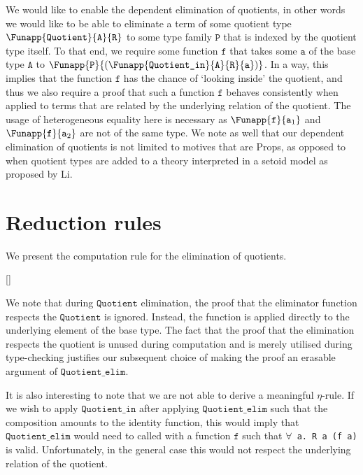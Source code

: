 \documentclass[12pt,twoside,maitrise]{dms}
\theoremstyle{definition}
\numberwithin{equation}{section}
\numberwithin{table}{chapter}
\numberwithin{figure}{chapter}
\newcommand\id[1] {\texttt{#1}}
\newcommand\fn[1] {\texttt{#1}}
\newcommand\type[1] {\textsf{#1}} %
\begin{document}
We would like to enable the dependent elimination of quotients, in other words
we would like to be able to eliminate a term of some quotient type
$\Funapp{\id{Quotient}}{\id{A}}{\id{R}}$ to some type family $\id{P}$ that is
indexed by the quotient type itself. To that end, we require some function
$\id{f}$ that takes some $\id{a}$ of the base type $\id{A}$ to
$\Funapp{\id{P}}{(\Funapp{\id{Quotient\_in}}{\id{A}}{\id{R}}{\id{a}})}$. In a
way, this implies that the function $\id{f}$ has the chance of `looking inside'
the quotient, and thus we also require a proof that such a function $\id{f}$
behaves consistently when applied to terms that are related by the underlying
relation of the quotient. The usage of heterogeneous equality here is necessary
as $\Funapp{\id{f}}{\id{a}_1}$ and $\Funapp{\id{f}}{\id{a}_2}$ are not of the
same type. We note as well that our dependent elimination of quotients is not
limited to motives that are \type{Props}, as opposed to when quotient types are
added to a theory interpreted in a setoid model as proposed by
Li\cite{li2015quotient}.

\section{Reduction rules}
We present the computation rule for the elimination of quotients.

\begin{prooftree*}
   \hypo{\id{q} \rightsquigarrow \Funapp{\id{Quotient\_in}}{\id{A}}{\id{R}}{\id{a}}}
   []{\Funapp{\id{Quotient\_elim}}{\id{A}}{\id{R}}{\id{f}}{\id{h}}{\id{q}}
             \rightsquigarrow \Funapp{\id{f}}{\id{a}}}
\end{prooftree*}

We note that during $\id{Quotient}$ elimination, the proof that the eliminator
function respects the $\id{Quotient}$ is ignored. Instead, the function is
applied directly to the underlying element of the base type. The fact that the
proof that the elimination respects the quotient is unused during computation
and is merely utilised during type-checking justifies our subsequent choice of
making the proof an erasable argument of $\id{Quotient\_elim}$.

It is also interesting to note that we are not able to derive a meaningful
$\eta$-rule. If we wish to apply $\id{Quotient\_in}$ after applying
$\id{Quotient\_elim}$ such that the composition amounts to the identity
function, this would imply that $\id{Quotient\_elim}$ would need to called with
a function $\id{f}$ such that \fn{$\forall$ a. R a (f a)} is valid.
Unfortunately, in the general case this would not respect the underlying
relation of the quotient.
\end{document}
